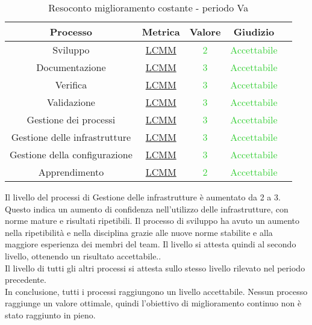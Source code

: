\begin{table}[H]
	\centering
	
	
	\begin{tabular}{c | c | c | c | c}
		\hline
		\textbf{Processo}          & \textbf{Metrica}                & \textbf{Valore}                            & \textbf{Giudizio}                           \\ \hline
		Sviluppo             & \hyperref[MMC]{LCMM}   & \textcolor{LimeGreen}{2}          & \textcolor{LimeGreen}{Accettabile} \\
		Documentazione       & \hyperref[MMC]{LCMM}   & \textcolor{LimeGreen}{3}          & \textcolor{LimeGreen}{Accettabile} \\
		Verifica            & \hyperref[MMC]{LCMM}   & \textcolor{LimeGreen}{3}          & \textcolor{LimeGreen}{Accettabile} \\
		Validazione & \hyperref[MMC]{LCMM}   & \textcolor{LimeGreen}{3}          & \textcolor{LimeGreen}{Accettabile} \\
		Gestione dei processi       & \hyperref[MMC]{LCMM}   & \textcolor{LimeGreen}{3}          & \textcolor{LimeGreen}{Accettabile} \\
		Gestione delle infrastrutture  & \hyperref[MMC]{LCMM}   & \textcolor{LimeGreen}{3}          & \textcolor{LimeGreen}{Accettabile} \\
		Gestione della configurazione   & \hyperref[MMC]{LCMM}   & \textcolor{LimeGreen}{3}          & \textcolor{LimeGreen}{Accettabile} \\	
		Apprendimento             & \hyperref[MMC]{LCMM}   & \textcolor{LimeGreen}{2}          & \textcolor{LimeGreen}{Accettabile} \\
		\hline
	\end{tabular}
	\caption{Resoconto miglioramento costante - periodo Va}
	\label{tab:resoconto_obiettivo_miglioramento_costante_Va}
\end{table}

Il livello  del processi di Gestione delle infrastrutture è aumentato da 2 a 3. Questo indica un aumento di confidenza nell'utilizzo delle infrastrutture, con norme mature e risultati ripetibili.
Il processo di sviluppo ha avuto un aumento nella ripetibilità e nella disciplina grazie alle nuove norme stabilite e alla maggiore esperienza dei membri del team. Il livello si attesta quindi al secondo livello, ottenendo un risultato accettabile..\\
Il livello di tutti gli altri processi si attesta sullo stesso livello rilevato nel periodo precedente.\\
In conclusione, tutti i processi raggiungono un livello accettabile. Nessun processo raggiunge un valore ottimale, quindi l'obiettivo di miglioramento continuo non è stato raggiunto in pieno.

